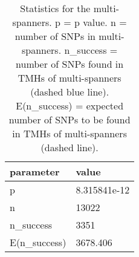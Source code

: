 \begin{table}

\caption{\label{tab:snp_stats_per_spanner_multi}Statistics for the multi-spanners. p = p value. n = number of SNPs in multi-spanners. n\_success = number of SNPs found in TMHs of multi-spanners (dashed blue line). E(n\_success) = expected number of SNPs to be found in TMHs of multi-spanners  (dashed line). }
\centering
\begin{tabular}[t]{l|l}
\hline
parameter & value\\
\hline
p & 8.315841e-12\\
\hline
n & 13022\\
\hline
n\_success & 3351\\
\hline
E(n\_success) & 3678.406\\
\hline
\end{tabular}
\end{table}
